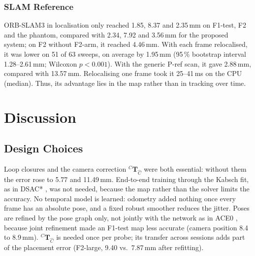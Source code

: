 \documentclass[9pt,shortpaper,twoside,web]{ieeecolor2}
\newcommand{\Tf}[2]{{}^{#1}\mathbf{T}_{#2}}
\newcommand{\Ch}{\hat{C}}%
\newcommand{\Tcorr}{\Tf{C}{\Ch}}%
\newcommand{\Pref}{P-ref}
\newcommand{\Ftest}{F1-test}
\newcommand{\Ftwo}{F2}
\newcommand{\Flarge}{F2-large}
\newcommand{\Farm}{F2-arm}
\begin{document}
\subsubsection{SLAM Reference} ORB-SLAM3 in localisation only reached 1.85, 8.37 and 2.35\,mm on \Ftest{}, \Ftwo{} and the phantom, compared with 2.34, 7.92 and 3.56\,mm for the proposed system; on \Ftwo{} without \Farm{}, it reached 4.46\,mm. With each frame relocalised, it was lower on 51 of 63 sweeps, on average by 1.95\,mm (95\,\% bootstrap interval 1.28--2.61\,mm; Wilcoxon $p<0.001$). With the generic \Pref{} scan, it gave 2.88\,mm, compared with 13.57\,mm. Relocalising one frame took it 25--41\,ms on the CPU (median). Thus, its advantage lies in the map rather than in tracking over time.


\section{Discussion}
\label{sec:discussion}

\subsection{Design Choices}
\label{sec:design}
Loop closures and the camera correction $\Tcorr$ were both essential: without them the error rose to 5.77 and 11.49\,mm. End-to-end training through the Kabsch fit, as in DSAC* \cite{brachmann2022dsac}, was not needed, because the map rather than the solver limits the accuracy. No temporal model is learned: odometry added nothing once every frame has an absolute pose, and a fixed robust smoother reduces the jitter. Poses are refined by the pose graph only, not jointly with the network as in ACE0 \cite{brachmann2024ace0}, because joint refinement made an \Ftest{} map less accurate (camera position 8.4 to 8.9\,mm). $\Tcorr$ is needed once per probe; its transfer across sessions adds part of the placement error (\Flarge{}, 9.40 vs.\ 7.87\,mm after refitting).
\end{document}
